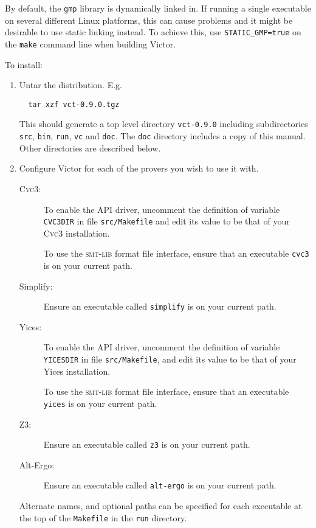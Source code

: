 \documentclass[12pt,fleqn]{article}
\newcommand{\cvcthree}{\textsc{Cvc}3}
\newcommand{\zthree}{\textsc{Z}3}
\newcommand{\yices}{Yices}
\newcommand{\altergo}{Alt-Ergo}
\newcommand{\smtlib}{\textsc{smt-lib}}
\begin{document}
By default, the \texttt{gmp} library is dynamically linked in.  If
running a single executable on several different Linux platforms, this
can cause problems and it might be desirable to use static linking
instead.  To achieve this, use \texttt{STATIC\_GMP=true} on the
\texttt{make} command line when building Victor.

To install:
\begin{enumerate}
\item Untar the distribution.  E.g. 
\begin{verbatim}
  tar xzf vct-0.9.0.tgz
\end{verbatim}
  This should generate a top level directory
  \texttt{vct-0.9.0} including subdirectories 
    \texttt{src},
    \texttt{bin},
    \texttt{run},
    \texttt{vc}
   and \texttt{doc}.
   The \texttt{doc} directory includes a copy of this manual.
   Other directories are described below.
\item 
  Configure Victor for each of the provers you wish to use it with.
  \begin{description}

  \item[\cvcthree:] To enable the API driver, uncomment the definition
    of variable \texttt{CVC3DIR} in file \texttt{src/Makefile} and edit
    its value to be that of your \cvcthree{} installation.  
    
    To use the \smtlib{} format file interface, ensure that an
    executable \texttt{cvc3} is on your current path.

  \item[Simplify:] Ensure an executable called \texttt{simplify} is on your
    current path. 

  \item[\yices:] 
    To enable the API driver, uncomment the definition of variable
    \texttt{YICESDIR} in file \texttt{src/Makefile}, and edit its
    value to be that of your \yices{} installation.

    To use the \smtlib{} format file interface, ensure that an
    executable \texttt{yices} is on your current path.

  \item[\zthree:]  Ensure an executable called \texttt{z3} is on your
    current path.

  \item[\altergo:]  Ensure an executable called \texttt{alt-ergo} is on your
    current path.
  \end{description}
  Alternate names, and optional paths can be specified for each executable
  at the top of the \texttt{Makefile} in the \texttt{run} directory.


\end{enumerate}
\end{document}
